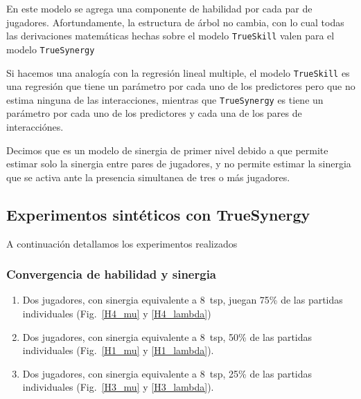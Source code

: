 \documentclass[a4paper,11pt]{book}
\theoremstyle{definition}
\begin{document}
En este modelo se agrega una componente de habilidad por cada par de jugadores.
Afortundamente, la estructura de \'arbol no cambia, con lo cual todas las derivaciones matem\'aticas hechas sobre el modelo \texttt{TrueSkill} valen para el modelo \texttt{TrueSynergy}

Si hacemos una analog\'ia con la regresi\'on lineal multiple, el modelo \texttt{TrueSkill} es una regresi\'on que tiene un par\'ametro por cada uno de los predictores pero que no estima ninguna de las interacciones, mientras que \texttt{TrueSynergy} es tiene un par\'ametro por cada uno de los predictores y cada una de los pares de interacci\'ones.

Decimos que es un modelo de sinergia de primer nivel debido a que permite estimar solo la sinergia entre pares de jugadores, y no permite estimar la sinergia que se activa ante la presencia simultanea de tres o m\'as jugadores.

\subsection{Experimentos sint\'eticos con TrueSynergy}

A continuaci\'on detallamos los experimentos realizados

\subsubsection{Convergencia de habilidad y sinergia}
\begin{enumerate}

 \item Dos jugadores, con sinergia equivalente a $8$~tsp, juegan 75\% de las partidas individuales (Fig.~\ref{H4_mu} y \ref{H4_lambda})

 \item Dos jugadores, con sinergia equivalente a $8$~tsp, 50\% de las partidas individuales (Fig.~\ref{H1_mu} y \ref{H1_lambda}).

 \item Dos jugadores, con sinergia equivalente a $8$~tsp, 25\% de las partidas individuales (Fig.~\ref{H3_mu} y \ref{H3_lambda}).

\end{enumerate}
\end{document}
